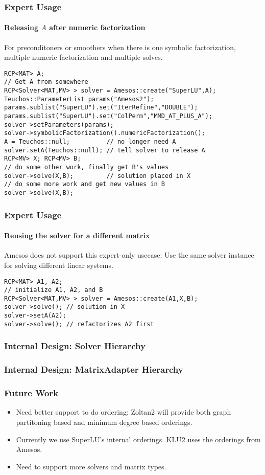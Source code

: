 \documentclass[xcolor=dvipsnames]{beamer}
\begin{document}
\begin{frame}[fragile]
  \frametitle{Expert Usage}
  \framesubtitle{Releasing $A$ after numeric factorization}
  For preconditoners or smoothers when there is one symbolic factorization,
  multiple numeric factorization and multiple solves.
  \begin{lstlisting}
RCP<MAT> A;
// Get A from somewhere
RCP<Solver<MAT,MV> > solver = Amesos::create("SuperLU",A);
Teuchos::ParameterList params("Amesos2");
params.sublist("SuperLU").set("IterRefine","DOUBLE");
params.sublist("SuperLU").set("ColPerm","MMD_AT_PLUS_A");
solver->setParameters(params);
solver->symbolicFactorization().numericFactorization();
A = Teuchos::null;          // no longer need A
solver.setA(Teuchos::null); // tell solver to release A
RCP<MV> X; RCP<MV> B;
// do some other work, finally get B's values
solver->solve(X,B);         // solution placed in X
// do some more work and get new values in B
solver->solve(X,B);
  \end{lstlisting}
\end{frame}

\begin{frame}[fragile]
  \frametitle{Expert Usage}
  \framesubtitle{Reusing the solver for a different matrix}
  Amesos does not support this expert-only usecase: Use the same solver instance  for solving different linear systems.
  \begin{lstlisting}
RCP<MAT> A1, A2;
// initialize A1, A2, and B
RCP<Solver<MAT,MV> > solver = Amesos::create(A1,X,B);
solver->solve(); // solution in X
solver->setA(A2);
solver->solve(); // refactorizes A2 first
  \end{lstlisting}
\end{frame}


\begin{frame}
  \frametitle{Internal Design: Solver Hierarchy}
\end{frame}

\begin{frame}
  \frametitle{Internal Design: MatrixAdapter Hierarchy}
\end{frame}

\begin{frame}
  \frametitle{Future Work}
  \begin{itemize}
  \item Need better support to do ordering: Zoltan2 will provide both
    graph partitoning based and minimum degree based orderings.
  \item  Currently we use SuperLU's internal orderings. KLU2 uses the orderings
    from Amesos.
  \item Need to support more solvers and matrix types.
  \end{itemize}
\end{frame}
\end{document}
